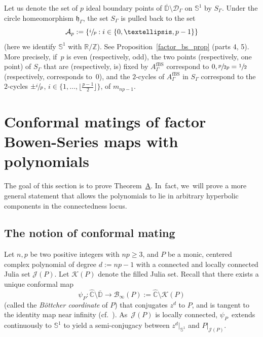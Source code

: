 \documentclass[10pt,a4paper]{amsart}
\newcommand{\cf}{cf.\ }
\theoremstyle{definition}
\theoremstyle{remark}
\newcommand{\C}{\mathbb{C}}
\newcommand{\D}{\mathbb{D}}
\newcommand{\R}{\mathbb{R}}
\newcommand{\Z}{\mathbb{Z}}
\begin{document}
Let us denote the set of $p$ ideal boundary points of $\overline{\D}\setminus \mathcal{D}_{\Gamma}$ on $\mathbb{S}^1$ by $S_{\Gamma}$.
Under the circle homeomorphism $\mathfrak{h}_\Gamma$, the set $S_{\Gamma}$ is pulled back to the set
\[
\displaystyle\mathcal{A}_p:=\{\sfrac{i}{p}:i\in\{0,\dots,p-1\}\}
\]
(here we identify $\mathbb{S}^1$ with $\R/\Z$). See Proposition~\ref{factor_bs_prop} (parts 4, 5). More precisely, if~$p$ is even (respectively, odd), the two points (respectively, one point) of $S_{\Gamma}$ that are (respectively, is) fixed by $A_{\Gamma}^{\mathrm{fBS}}$ correspond to $0,\sfrac{p}{2p}=\sfrac{1}{2}$ (respectively, corresponds to~$0$), and the $2$-cycles of $A_{\Gamma}^{\mathrm{fBS}}$ in $S_{\Gamma}$ correspond to the $2$-cycles $\pm \sfrac{i}{p}$, $i\in\{1,\dots,\lfloor \frac{p-1}{2}\rfloor\}$, of $m_{np-1}$.


\section{Conformal matings of factor Bowen-Series maps with polynomials}\label{conf_mating_sec}

The goal of this section is to prove Theorem~\href{https://jep.centre-mersenne.org/articles/10.5802/jep.315/}{A}. In~fact, we~will prove a more general statement that allows the polynomials to lie in arbitrary hyperbolic components in the connectedness locus.

\subsection{The notion of conformal mating}\label{conf_mating_def_subsec}

Let $n, p$ be two positive integers with \hbox{$np\geq 3$}, and $P$ be a monic, centered complex polynomial of degree $d:=np-1$ with a connected and locally connected Julia set $\mathcal{J}(P)$. Let $\mathcal{K}(P)$ denote the filled Julia set.
Recall that there exists a unique conformal map
\[
\psi_P:\widehat{\C}\setminus\overline{\D}\to\mathcal{B}_\infty(P):=\widehat{\C}\setminus\mathcal{K}(P)
\]
(called the \emph{Böttcher coordinate} of $P$) that conjugates $z^{d}$ to $P$, and is tangent to the identity map near infinity (\cf \cite[Th.\,9.1]{Mil06}). As~$\mathcal{J}(P)$ is locally connected, $\psi_P$~extends continuously to $\mathbb{S}^1$ to yield a semi-conjugacy between $z^d\vert_{\mathbb{S}^1}$ and $P\vert_{\mathcal{J}(P)}$.
\end{document}
